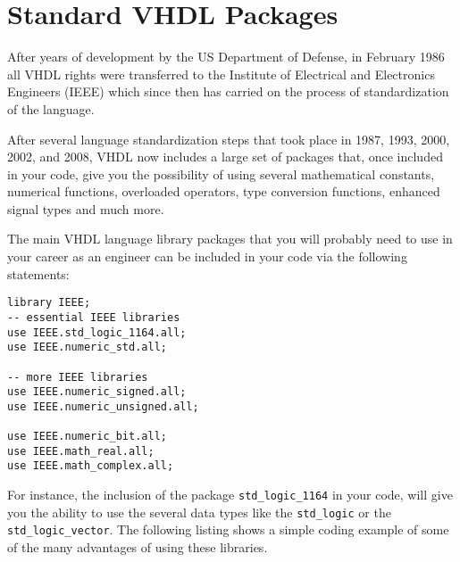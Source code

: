 \null\newpage
\thispagestyle{empty}
\mbox{}

\chapter{Standard VHDL Packages}
After years of development by the US Department of Defense, in February 1986 all VHDL rights were transferred to the Institute of Electrical and Electronics Engineers (IEEE) which since then has carried on the process of standardization of the language.

After several language standardization steps that took place in 1987, 1993, 2000, 2002, and 2008, VHDL now includes a large set of packages that, once included in your code, give you the possibility of using several mathematical constants, numerical functions, overloaded operators, type conversion functions, enhanced signal types and much more.

The main VHDL language library packages that you will probably need to use in your career as an engineer can be included in your code via the following statements:

{\scriptsize
\begin{lstlisting}
library IEEE;
-- essential IEEE libraries
use IEEE.std_logic_1164.all;
use IEEE.numeric_std.all;

-- more IEEE libraries
use IEEE.numeric_signed.all;
use IEEE.numeric_unsigned.all;

use IEEE.numeric_bit.all;
use IEEE.math_real.all;
use IEEE.math_complex.all;
\end{lstlisting}
}

For instance, the inclusion of the package \texttt{std\_logic\_1164} in your code, will give you the ability to use the several data types like the \texttt{std\_logic} or the \texttt{std\_logic\_vector}. The following listing shows a simple coding example of some of the many advantages of using these libraries.

